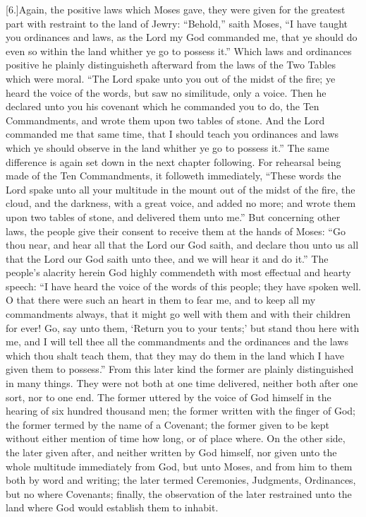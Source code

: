 [6.]Again, the positive laws which Moses gave, they were given for the greatest part with restraint to the land of Jewry: “Behold,” saith Moses, “I have taught you ordinances and laws, as the Lord my God commanded me, that ye should do even so within the land whither ye go to possess it.” Which laws and ordinances positive he plainly distinguisheth afterward from the laws of the Two Tables which were moral. “The Lord spake unto you out of the midst of the fire; ye heard the voice of the words, but saw no similitude, only a voice. Then he declared unto you his covenant which he commanded you to do, the Ten Commandments, and wrote them upon two tables of stone. And the Lord commanded me that same time, that I should teach you ordinances and laws which ye should observe in the land whither ye go to possess it.” The same difference is again set down in the next chapter following. For rehearsal being made of the Ten Commandments, it followeth immediately, “These words the Lord spake unto all your multitude in the mount out of the midst of the fire, the cloud, and the darkness, with a great voice, and added no  more; and wrote them upon two tables of stone, and delivered them unto me.” But concerning other laws, the people give their consent to receive them at the hands of Moses: “Go thou near, and hear all that the Lord our God saith, and declare thou unto us all that the Lord our God saith unto thee, and we will hear it and do it.” The people’s alacrity herein God highly commendeth with most effectual and hearty speech: “I have heard the voice of the words of this people; they have spoken well. O that there were such an heart in them to fear me, and to keep all my commandments always, that it might go well with them and with their children for ever! Go, say unto them, ‘Return you to your tents;’ but stand thou here with me, and I will tell thee all the commandments and the ordinances and the laws which thou shalt teach them, that they may do them in the land which I have given them to possess.” From this later kind the former are plainly distinguished in many things. They were not both at one time delivered, neither both after one sort, nor to one end. The former uttered by the voice of God himself in the hearing of six hundred thousand men; the former written with the finger of God; the former termed by the name of a Covenant; the former given to be kept without either mention of time how long, or of place where. On the other side, the later given after, and neither written by God himself, nor given unto the whole multitude immediately from God, but unto Moses, and from him to them both by word and writing; the later termed Ceremonies, Judgments, Ordinances, but no where Covenants; finally, the observation of the later restrained unto the land where God would establish them to inhabit.

